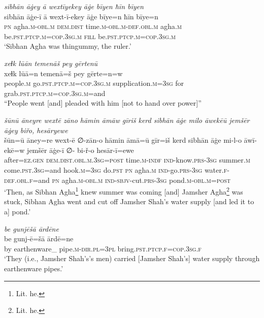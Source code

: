 \ea \label{DP.26}
\textit{sibhān āġey ā wextīyekey āġe bīyen ħīn bīyen} \\ 
\gll sibhān āġe-ī ā wext-ī-ekey āġe bīye=n ħīn bīye=n \\ 
 \textsc{pn} agha\textsc{.m}\textsc{-obl}\textsc{.m} \textsc{dem.dist} time\textsc{.m}\textsc{-obl}\textsc{.m}\textsc{-def}\textsc{.obl}\textsc{.m} agha\textsc{.m} be\textsc{.pst}\textsc{.ptcp}\textsc{.m}\textsc{=cop}\textsc{.3sg}\textsc{.m} \textsc{fill} be\textsc{.pst}\textsc{.ptcp}\textsc{.m}\textsc{=cop}\textsc{.3sg}\textsc{.m} \\ 
\glt `Sibhan Agha was thingummy, the ruler.'
\z 
 
\ea \label{DP.29}
\textit{xeɫk lūān temenāš pey gērtenū} \\ 
\gll xeɫk lūā=n temenā=š pey gērte=n=w \\ 
 people\textsc{.m} go\textsc{.pst}\textsc{.ptcp}\textsc{.m}\textsc{=cop}\textsc{.3sg}\textsc{.m} supplication\textsc{.m}\textsc{=3sg} for grab\textsc{.pst}\textsc{.ptcp}\textsc{.m}\textsc{=cop}\textsc{.3sg}\textsc{.m}=and \\ 
\glt ``People went [and] pleaded with him [not to hand over power]''
\z 
 
\ea \label{DP.30}
\textit{šūnū āneyre wextē zāno hāmin āmāw gīriš kerd sibhān āġe milo āwekēū jemšēr āġey biřo, hesāryewe} \\ 
\gll šūn=ū āney=re wext-ē ∅-zān-o hāmin āmā=ū gīr=iš kerd sibhān āġe mi-l-o āwī-ekē=w jemšēr āġe-ī ∅- bi-ř-o hesār-ī=ewe \\ 
 after\textsc{=ez}\textsc{.gen} \textsc{dem.dist}\textsc{.obl}\textsc{.m}\textsc{.3sg}\textsc{=\textsc{post}} time\textsc{.m}\textsc{-indf} \textsc{ind-}know\textsc{.prs}\textsc{-3sg} summer\textsc{.m} come\textsc{.pst}\textsc{.3sg}=and hook\textsc{.m}\textsc{=3sg} do\textsc{.pst} \textsc{pn} agha\textsc{.m} \textsc{ind-}go\textsc{.prs}\textsc{-3sg} water\textsc{\textsc{.f}}\textsc{-def}\textsc{.obl}\textsc{\textsc{.f}}=and \textsc{pn} agha\textsc{.m}\textsc{-obl}\textsc{.m} \textsc{ind-}\textsc{sbjv-}cut\textsc{.prs}\textsc{-3sg} pond\textsc{.m}\textsc{-obl}\textsc{.m}\textsc{=\textsc{post}} \\ 
\glt `Then, as Sibhan Agha\footnote{Lit. he.} knew summer was coming [and] Jamsher Agha\footnote{Lit. he.} was stuck, Sibhan Agha went and cut off Jamsher Shah’s water supply [and led it to a] pond.'
\z 
 
\ea \label{DP.31}
\textit{be gunjēšā ārdēne} \\ 
\gll be gunj-ē=šā ārdē=ne \\ 
 by earthenware\_ pipe\textsc{.m}\textsc{-dir}\textsc{.pl}\textsc{=3pl} bring\textsc{.pst}\textsc{.ptcp}\textsc{\textsc{.f}}\textsc{=cop}\textsc{.3sg}\textsc{\textsc{.f}} \\ 
\glt `They (i.e., Jamsher Shah’s’s men) carried [Jamsher Shah’s] water supply through earthenware pipes.'
\z 
 
